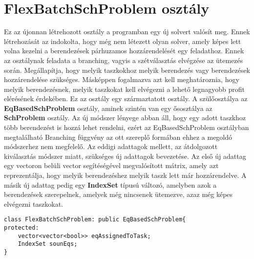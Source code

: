 \section{FlexBatchSchProblem osztály}
Ez az újonnan létrehozott osztály a programban egy új solvert valósít meg.
Ennek létrehozását az indokolta, hogy még nem létezett olyan solver, amely képes lett volna kezelni a berendezések párhuzamos hozzárendelését egy feladathoz.
Ennek az osztálynak feladata a branching, vagyis a szétválasztás elvégzése az ütemezés során.
Megállapítja, hogy melyik taszkokhoz melyik berendezés vagy berendezések hozzárendelése szükséges.
Másképpen fogalmazva azt kell meghatároznia, hogy melyik berendezésnek, melyik taszkokat kell elvégezni a lehető legnagyobb profit elérésének érdekében.
Ez az osztály egy származtatott osztály.
A szülőosztálya az \textbf{EqBasedSchProblem} osztály, aminek szintén van egy ősosztálya az \textbf{SchProblem} osztály.
Az új módszer lényege abban áll, hogy egy adott taszkhoz több berendezést is hozzá lehet rendelni, ezért az EqBasedSchProblem osztályban megtalálható Branching függvény az ott szereplő formában ehhez a megoldó módszerhez nem megfelelő.
Az eddigi adattagok mellett, az átdolgozott kiválasztás módszer miatt, szükséges új adattagok bevezetése.
Az első új adattag egy vectoron belüli vector segítéségével megvalósított mátrix, amely azt reprezentálja, hogy melyik berendezéshez melyik taszk lett már hozzárendelve.
A másik új adattag pedig egy \textbf{IndexSet} típusú változó, amelyben azok a berendezések szerepelnek, amelyek még nincsenek ütemezve, azaz még képes elvégezni taszkokat.
\begin{lstlisting}[caption={FlexBatchSchProblem osztály adattagjai}]
class FlexBatchSchProblem: public EqBasedSchProblem{
protected:
	vector<vector<bool>> eqAssignedToTask;
    IndexSet sounEqs;
}
\end{lstlisting}

